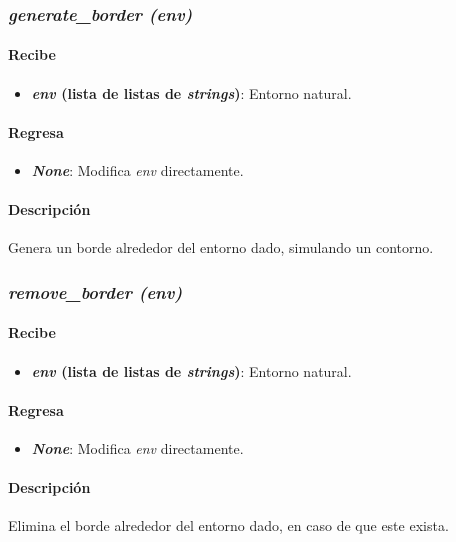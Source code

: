 \documentclass[12pt, letterpaper]{article}
\begin{document}
        \subsubsection{\textit{generate\_border (env)}}
            \paragraph{Recibe}
                \begin{itemize}
                    \item \textbf{\textit{env} (lista de listas de \textit{strings})}: Entorno natural.
                \end{itemize}
            \paragraph{Regresa}
                \begin{itemize}
                    \item \textbf{\textit{None}}: Modifica \textit{env} directamente.
                \end{itemize}
            \paragraph{Descripción}
                Genera un borde alrededor del entorno dado, simulando un contorno.
        \subsubsection{\textit{remove\_border (env)}}
            \paragraph{Recibe}
                \begin{itemize}
                    \item \textbf{\textit{env} (lista de listas de \textit{strings})}: Entorno natural.
                \end{itemize}
            \paragraph{Regresa}
                \begin{itemize}
                    \item \textbf{\textit{None}}: Modifica \textit{env} directamente.
                \end{itemize}
            \paragraph{Descripción}
                Elimina el borde alrededor del entorno dado, en caso de que este exista.
\end{document}
